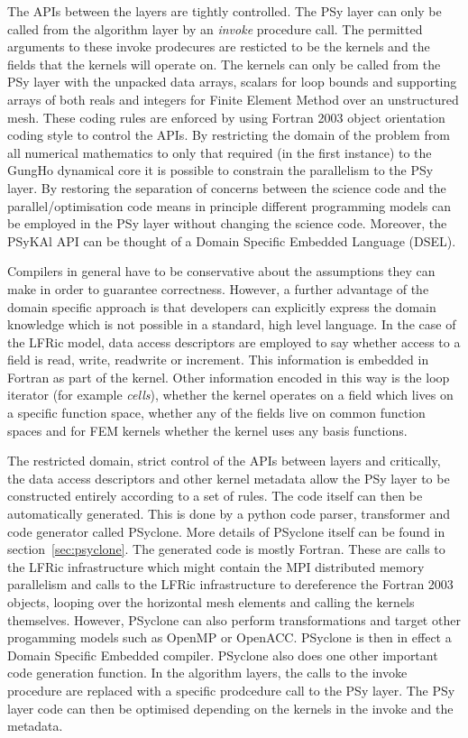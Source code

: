 \documentclass[times]{elsarticle}
\begin{document}
The APIs between the layers are tightly controlled. The PSy layer can
only be called from the algorithm layer by an {\em invoke} procedure
call. The permitted arguments to these invoke prodecures are resticted
to be the kernels and the fields that the kernels will operate on. The
kernels can only be called from the PSy layer with the unpacked data
arrays, scalars for loop bounds and supporting arrays of both reals
and integers for Finite Element Method over an unstructured mesh.
These coding rules are enforced by using Fortran 2003 object
orientation coding style to control the APIs. By restricting the
domain of the problem from all numerical mathematics to only that
required (in the first instance) to the GungHo dynamical core it is
possible to constrain the parallelism to the PSy layer. By restoring
the separation of concerns between the science code and the
parallel/optimisation code means in principle different programming
models can be employed in the PSy layer without changing the science
code. Moreover, the PSyKAl API can be thought of a Domain Specific
Embedded Language (DSEL).

Compilers in general have to be conservative about the assumptions
they can make in order to guarantee correctness. However, a further
advantage of the domain specific approach is that developers can
explicitly express the domain knowledge which is not possible in a
standard, high level language. In the case of the LFRic model, data
access descriptors are employed to say whether access to a field is
read, write, readwrite or increment. This information is embedded in
Fortran as part of the kernel. Other information encoded in this way
is the loop iterator (for example {\em cells}), whether the kernel
operates on a field which lives on a specific function space, whether
any of the fields live on common function spaces and for FEM kernels
whether the kernel uses any basis functions. 

The restricted domain, strict control of the APIs between layers and
critically, the data access descriptors and other kernel metadata
allow the PSy layer to be constructed entirely according to a set of
rules. The code itself can then be automatically generated. This is
done by a python code parser, transformer and code generator called
PSyclone. More details of PSyclone itself can be found in
section~\ref{sec:psyclone}. The generated code is mostly Fortran.
These are calls to the LFRic infrastructure which might contain the
MPI distributed memory parallelism and calls to the LFRic
infrastructure to dereference the Fortran 2003 objects, looping over
the horizontal mesh elements and calling the kernels
themselves. However, PSyclone can also perform transformations and
target other progamming models such as OpenMP or OpenACC. PSyclone is
then in effect a Domain Specific Embedded compiler. PSyclone also does
one other important code generation function. In the algorithm layers,
the calls to the invoke procedure are replaced with a specific
prodcedure call to the PSy layer. The PSy layer code can then be
optimised depending on the kernels in the invoke and the metadata.
\end{document}
